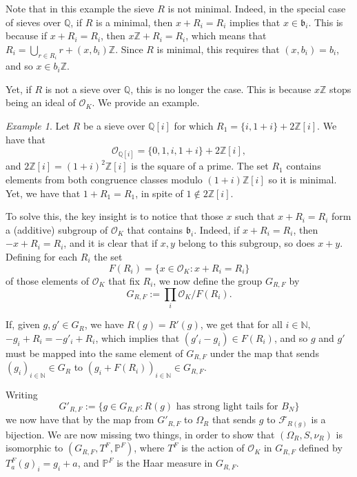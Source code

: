 \documentclass[a4paper,11pt,reqno]{amsart}
\theoremstyle{plain}
\theoremstyle{remark}
\newtheorem{example}[theorem]{Example}
\newcommand{\q}{\mathbb{Q}}
\newcommand{\z}{\mathbb{Z}}
\newcommand{\co}{\mathcal{O}}
\newcommand{\cf}{\mathcal{F}}
\newcommand{\gb}{\mathfrak{b}}
\newcommand{\grf}{G_{R,F}}
\newcommand{\mmp}{\mathbb{P}}
\begin{document}
			Note that in this example the sieve $R$ is not minimal. Indeed, in the special case of sieves over $\q$,  if $R$ is a minimal, then $x+R_i = R_i$ implies that $x \in \gb_i$.  This is because if $x+ R_i = R_i$, then $x\z + R_i = R_i$, which means that $R_i = \bigcup_{r \in R_i} r+ (x,b_i)\z.$ Since $R$ is minimal, this requires that $(x,b_i) = b_i$, and so $x \in b_i\z$. 
			
			Yet, if $R$ is not a sieve over $\q$, this is no longer the case. This is because $x\z$ stops being an ideal of $\co_K$. We provide an example.
			
			\begin{example}
				Let $R$ be a sieve over $\q[i]$ for which $R_1 = \{i,1+i\}+2\z[i]$. We have that $$\co_{\q[i]} = \{0,1,i,1+i\}+2\z[i],$$ and $2\z[i] = (1+i)^2\z[i]$ is the square of a prime. The set $R_1$ contains elements from both congruence classes modulo $ (1+i)\z[i]$ so it is minimal. Yet, we have that $1+ R_1 =  R_1$, in spite of $1 \not \in 2\z[i]$.
			\end{example} 
			
			To solve this, the key insight is to notice that those $x$ such that $x+R_i = R_i$ form a (additive) subgroup of $\co_K$ that contains $\gb_i$. Indeed, if $x+R_i = R_i$, then $-x+R_i = R_i$, and it is clear that if $x,y$ belong to this subgroup, so does $x+y$. Defining for each $R_i$ the set  $$F(R_i) = \{x\in \co_K: x+ R_i = R_i\}$$ of those elements of $\co_K$ that fix $R_i$, we now define the group $\grf$ by \begin{equation}
				\grf := \prod_i \co_K/F(R_i).
			\end{equation} 
			
			If, given $g,g' \in G_R$, we have $R(g) = R'(g)$, we get that for all $i\in \mathbb{N},$ $-g_i + R_i = -g'_i + R_i$, which implies that $(g'_i-g_i) \in F(R_i)$, and so $g$ and $g'$ must be mapped into the same element of $\grf$ under the map that sends $(g_i)_{i \in \mathbb{N}} \in G_R$ to $(g_i + F(R_i))_{i \in \mathbb{N}} \in \grf$.
			
			Writing 
			\begin{equation}
				\label{eq: definition of G'RF}
				G'_{R,F} := \{g \in \grf: R(g) \text{ has strong light tails for }B_N\}
			\end{equation}
			we now have that by  the map from $G'_{R,F}$ to $\Omega_{R}$ that sends $g$ to $\cf_{R(g)}$ is a bijection. We are now missing two things, in order to show that  $(\Omega_{R}, S,\nu_R)$ is isomorphic to $(\grf,T^F,\mmp^F)$, where $T^F$ is the action of $\co_K$ in $\grf$ defined by $T^F_a(g)_i = g_i +a$, and $\mmp^F$ is the Haar measure in $\grf$.
			
\end{document}
